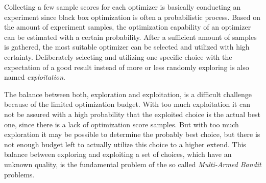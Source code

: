 Collecting a few sample scores for each optimizer is basically conducting an experiment since black box optimization is often a probabilistic process.
Based on the amount of experiment samples, the optimization capability of an optimizer can be estimated with a certain probability.
After a sufficient amount of samples is gathered, the most suitable optimizer can be selected and utilized with high certainty.
Deliberately selecting and utilizing one specific choice with the expectation of a good result instead of more or less randomly exploring is also named \textit{exploitation}.

The balance between both, exploration and exploitation, is a difficult challenge because of the limited optimization budget.
With too much exploitation it can not be assured with a high probability that the exploited choice is the actual best one, since there is a lack of optimization score samples.
But with too much exploration it may be possible to determine the probably best choice, but there is not enough budget left to actually utilize this choice to a higher extend.
This balance between exploring and exploiting a set of choices, which have an unknown quality, is the fundamental problem of the so called \textit{Multi-Armed Bandit} problems.

